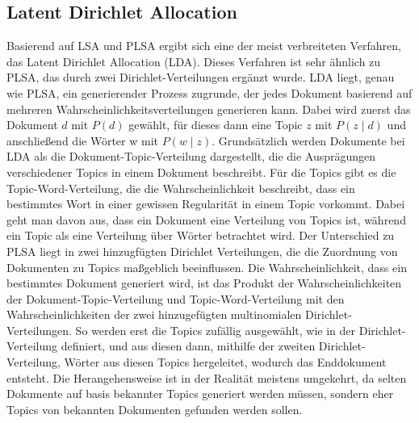 \documentclass[german,version-2020-11]{uzl-thesis}
\begin{document}
\subsection{Latent Dirichlet Allocation}
Basierend auf LSA und PLSA ergibt sich eine der meist verbreiteten Verfahren, das Latent Dirichlet Allocation (LDA). Dieses Verfahren ist sehr ähnlich zu PLSA, das durch zwei Dirichlet-Verteilungen ergänzt wurde. LDA liegt, genau wie PLSA, ein generierender Prozess zugrunde, der jedes Dokument basierend auf mehreren Wahrscheinlichkeitsverteilungen generieren kann. Dabei wird zuerst das Dokument $d$ mit $P(d)$ gewählt, für dieses dann eine Topic $z$ mit $P(z \mid d)$ und anschließend die Wörter w mit $P(w \mid z)$. Grundsätzlich werden Dokumente bei LDA als die Dokument-Topic-Verteilung dargestellt, die die Ausprägungen verschiedener Topics in einem Dokument beschreibt. Für die Topics gibt es die Topic-Word-Verteilung, die die Wahrscheinlichkeit beschreibt, dass ein bestimmtes Wort in einer gewissen Regularität in einem Topic vorkommt. Dabei geht man davon aus, dass ein Dokument eine Verteilung von Topics ist, während ein Topic als eine Verteilung über Wörter betrachtet wird. Der Unterschied zu PLSA liegt in zwei hinzugfügten Dirichlet Verteilungen, die die Zuordnung von Dokumenten zu Topics maßgeblich beeinflussen.
Die Wahrscheinlichkeit, dass ein bestimmtes Dokument generiert wird, ist das Produkt der Wahrscheinlichkeiten der Dokument-Topic-Verteilung und Topic-Word-Verteilung mit den Wahrscheinlichkeiten der zwei hinzugefügten multinomialen Dirichlet-Verteilungen. So werden erst die Topics zufällig ausgewählt, wie in der Dirichlet-Verteilung definiert, und aus diesen dann, mithilfe der zweiten Dirichlet-Verteilung, Wörter aus diesen Topics hergeleitet, wodurch das Enddokument entsteht. Die Herangehensweise ist in der Realität meistens umgekehrt, da selten Dokumente auf basis bekannter Topics generiert werden müssen, sondern eher Topics von bekannten Dokumenten gefunden werden sollen. 

\end{document}
